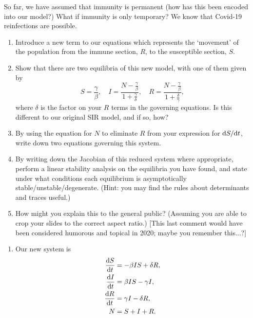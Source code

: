\documentclass[a4paper,12pt]{article}
\begin{document}
\begin{enumerate}[label={\bf \arabic{*}.\;}, ref={\arabic{*}},itemsep=3ex, left=0ex]
{    }

    { %
      So far, we have assumed that immunity is permanent (how has this been encoded into our model?) What if immunity is only temporary? We know that Covid-19 reinfections are possible.
      \begin{enumerate}[label=(\alph*)]
        \item Introduce a new term to our equations which represents the `movement' of the population from the immune section, $R$, to the susceptible section, $S$.
        \item Show that there are two equilibria of this new model, with one of them given by
          \begin{equation}
            S = \frac{\gamma}{\beta}, \quad I = \frac{N-\frac{\gamma}{\beta}}{1 + \frac{\gamma}{\delta}}, \quad R = \frac{N-\frac{\gamma}{\beta}}{1 + \frac{\delta}{\gamma}},
          \end{equation}
          where $\delta$ is the factor on your $R$ terms in the governing equations. Is this different to our original SIR model, and if so, how?
        \item By using the equation for $N$ to eliminate $R$ from your expression for $\fd{S}{t}$, write down two equations governing this system.
        \item By writing down the Jacobian of this reduced system where appropriate, perform a linear stability analysis on the equilibria you have found, and state under what conditions each equilibrium is asymptotically stable/unstable/degenerate. (Hint: you may find the rules about determinants and traces useful.)
        \item How might you explain this to the general public? (Assuming you are able to crop your slides to the correct aspect ratio.) [This last comment would have been considered humorous and topical in 2020; maybe you remember this...?]
      \end{enumerate}
    }
    { %
      \begin{enumerate}[label=(\alph*)]
        \item Our new system is
          \begin{align}
            \fd{S}{t} &= - \beta I S + \delta R, \\
            \fd{I}{t} &= \beta I S - \gamma I, \\
            \fd{R}{t} &= \gamma I - \delta R, \\
            N &= S + I + R.
          \end{align}


\end{enumerate}}
\end{enumerate}
\end{document}
